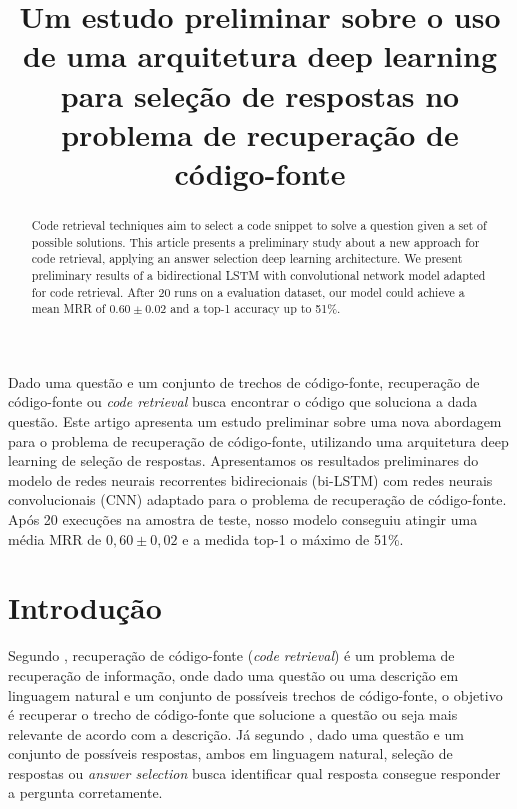 \documentclass[12pt]{article}
\title{Um estudo preliminar sobre o uso de uma arquitetura deep learning para seleção de respostas no problema de recuperação de código-fonte}
\begin{document}
 

\maketitle

\begin{abstract}
  Code retrieval techniques aim to select a code snippet to solve a question given a set of possible solutions. This article presents a preliminary study about a new approach for code retrieval, applying an answer selection deep learning architecture. We present preliminary results of a bidirectional LSTM with convolutional network model adapted for code retrieval. After 20 runs on a evaluation dataset, our model could achieve a mean MRR of $0.60 \pm 0.02$ and a top-1 accuracy up to 51\%.
\end{abstract}
     
\begin{resumo} 
  Dado uma questão e um conjunto de trechos de código-fonte, recuperação de código-fonte ou \textit{code retrieval} busca encontrar o código que soluciona a dada questão. Este artigo apresenta um estudo preliminar sobre uma nova abordagem para o problema de recuperação de código-fonte, utilizando uma arquitetura deep learning de seleção de respostas. Apresentamos os resultados preliminares do modelo de redes neurais recorrentes bidirecionais (bi-LSTM) com redes neurais convolucionais (CNN) adaptado para o problema de recuperação de código-fonte. Após 20 execuções na amostra de teste, nosso modelo conseguiu atingir uma média MRR de $0,60 \pm 0,02$ e a medida top-1 o máximo de 51\%.
\end{resumo}


\section{Introdução}

Segundo \cite{Allamanis-bimodal-source-code-natural-language:2015}, recuperação de código-fonte (\textit{code retrieval}) é um problema de recuperação de informação, onde dado uma questão ou uma descrição em linguagem natural e um conjunto de possíveis trechos de código-fonte, o objetivo é recuperar o trecho de código-fonte que solucione a questão ou seja mais relevante de acordo com a descrição. Já segundo \cite{lai-etal-2018-review}, dado uma questão e um conjunto de possíveis respostas, ambos em linguagem natural, seleção de respostas ou \textit{answer selection} busca identificar qual resposta consegue responder a pergunta corretamente. 
\end{document}
